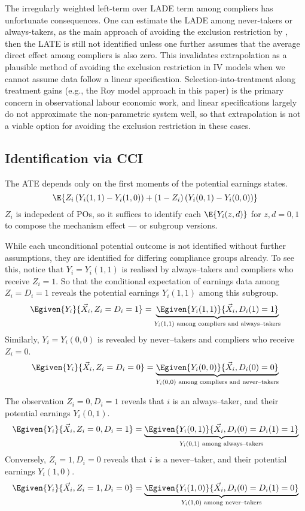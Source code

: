 The irregularly weighted left-term over LADE term among compliers has unfortunate consequences.
One can estimate the LADE among never-takers or always-takers, as the main approach of avoiding the exclusion restriction by \cite{slichter2014testing,van2018beyond}, then the LATE is still not identified unless one further assumes that the average direct effect among compliers is also zero.
This invalidates extrapolation as a plausible method of avoiding the exclusion restriction in IV models when we cannot assume data follow a linear specification.
Selection-into-treatment along treatment gains (e.g., the Roy model approach in this paper) is the primary concern in observational labour economic work, and linear specifications largely do not approximate the non-parametric system well, so that extrapolation is not a viable option for avoiding the exclusion restriction in these cases.


\subsection{Identification via CCI}
\label{sec:cci-identification}

The ATE depends only on the first moments of the potential earnings states.
\[ \E{ Z_i \left(Y_i(1, 1) - Y_i(1, 0) \right)
    + (1 - Z_i) \left(Y_i(0, 1) - Y_i(0, 0) \right)} \]
$Z_i$ is indepedent of POs, so it suffices to identify each $\E{ Y_i(z, d) }$ for $z,d = 0,1$ to compose the mechanism effect --- or subgroup versions.

While each unconditional potential outcome is not identified without further assumptions, they are identified for differing compliance groups already.
To see this, notice that $Y_i = Y_i(1,1)$ is realised by always--takers and compliers who receive $Z_i = 1$.
So that the conditional expectation of earnings data among $Z_i = D_i = 1$ reveals the potential earnings $Y_i(1,1)$ among this subgroup.
\[ \Egiven{ Y_i }{ \vec X_i, Z_i = D_i = 1}
= \underbrace{\Egiven{ Y_i(1,1) }{ \vec X_i, D_i(1) = 1}}_{
    Y_i(1,1) \text{ among compliers and always--takers}
} \]
Similarly, $Y_i = Y_i(0,0)$ is revealed by never--takers and compliers who receive $Z_i = 0$.
\[ \Egiven{ Y_i }{ \vec X_i, Z_i = D_i = 0}
= \underbrace{\Egiven{ Y_i(0,0) }{ \vec X_i, D_i(0) = 0}}_{
    Y_i(0,0) \text{ among compliers and never--takers}
} \]

The observation $Z_i = 0, D_i = 1$ reveals that $i$ is an always--taker, and their potential earnings $Y_i(0, 1)$.
\[ \Egiven{ Y_i }{ \vec X_i, Z_i = 0, D_i = 1}
= \underbrace{\Egiven{ Y_i(0,1) }{ \vec X_i, D_i(0) = D_i(1) = 1}}_{
    Y_i(0,1) \text{ among always--takers}
} \]
Conversely, $Z_i = 1, D_i = 0$ reveals that $i$ is a never--taker, and their potential earnings $Y_i(1, 0)$.
\[ \Egiven{ Y_i }{ \vec X_i, Z_i = 1, D_i = 0}
= \underbrace{\Egiven{ Y_i(1,0) }{ \vec X_i, D_i(0) = D_i(1) = 0}}_{
    Y_i(1,0) \text{ among never--takers}
} \]

